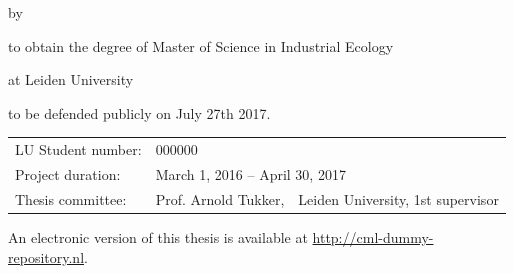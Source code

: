 \begin{titlepage}


\begin{center}

{\makeatletter
\largetitlestyle\fontsize{35}{94}\selectfont\@title
\makeatother}

{\makeatletter
\ifx\@subtitle\undefined\else
    \bigskip
   {\rmfamily\fontsize{22}{32}\selectfont\@subtitle}    
\fi
\makeatother}

\bigskip
\bigskip

by

\bigskip
\bigskip

{\makeatletter
\largetitlestyle\fontsize{26}{26}\selectfont\@author
\makeatother}

\bigskip
\bigskip

to obtain the degree of Master of Science in Industrial Ecology

at Leiden University

to be defended publicly on July 27th 2017.

\vfill

\begin{tabular}{lll}
    LU Student number: & 000000 \\
    Project duration: & \multicolumn{2}{l}{March 1, 2016 -- April 30, 2017} \\
    Thesis committee: & Prof. Arnold Tukker, & Leiden University, 1st supervisor 
\end{tabular}

\bigskip
\bigskip

\bigskip
\bigskip
An electronic version of this thesis is available at \url{http://cml-dummy-repository.nl}.



\end{center}


\end{titlepage}


